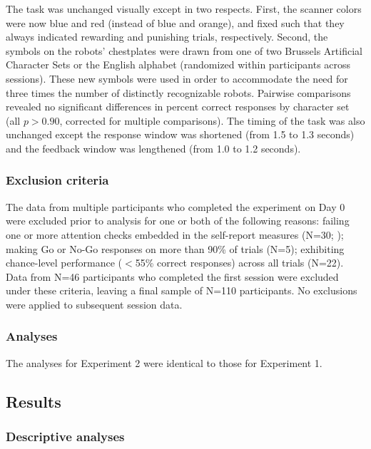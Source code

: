 \documentclass[a4paper,12pt]{article}
\begin{document}
\begin{refsection}[main]
The task was unchanged visually except in two respects. First, the scanner colors were now blue and red (instead of blue and orange), and fixed such that they always indicated rewarding and punishing trials, respectively. Second, the symbols on the robots' chestplates were drawn from one of two Brussels Artificial Character Sets \cite{vidal2017bacs} or the English alphabet (randomized within participants across sessions). These new symbols were used in order to accommodate the need for three times the number of distinctly recognizable robots. Pairwise comparisons revealed no significant differences in percent correct responses by character set (all $p > 0.90$, corrected for multiple comparisons). The timing of the task was also unchanged except the response window was shortened (from 1.5 to 1.3 seconds) and the feedback window was lengthened (from 1.0 to 1.2 seconds). 

\subsubsection*{Exclusion criteria}

The data from multiple participants who completed the experiment on Day 0 were excluded prior to analysis for one or both of the following reasons: failing one or more attention checks embedded in the self-report measures (N=30; \cite{zorowitz2023inattentive}); making Go or No-Go responses on more than 90\% of trials (N=5); exhibiting chance-level performance ($<$55\% correct responses) across all trials (N=22). Data from N=46 participants who completed the first session were excluded under these criteria, leaving a final sample of N=110 participants. No exclusions were applied to subsequent session data. 

\subsubsection*{Analyses}

The analyses for Experiment 2 were identical to those for Experiment 1. 

\subsection*{Results}

\subsubsection*{Descriptive analyses}


\end{refsection}
\end{document}
